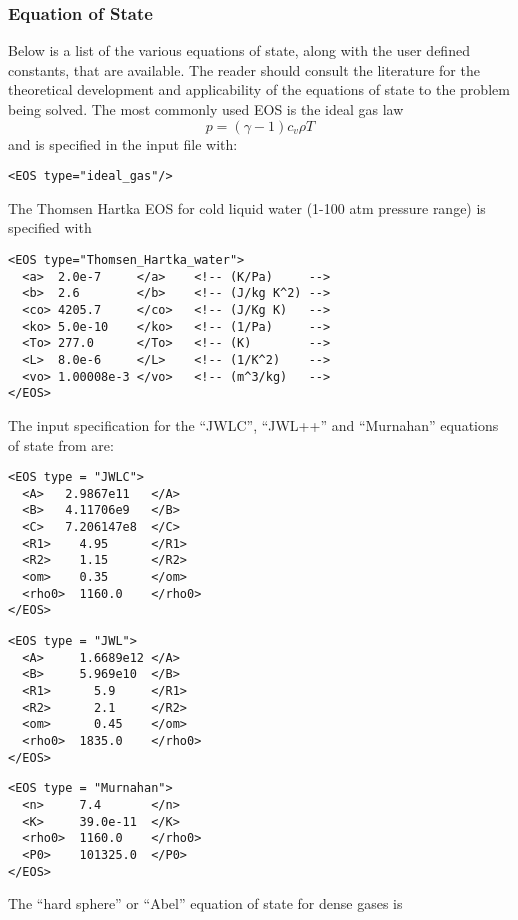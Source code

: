 \subsubsection{Equation of State}
Below is a list of the various equations of state, along with the user defined
constants, that are available.  The reader should consult the literature for
the theoretical development and applicability of the equations of state to
the problem being solved.
%
%
The most commonly used EOS is the ideal gas law
\begin{equation}
  p = (\gamma -1) c_v \rho T
\end{equation}
%
and is specified in the input file with:
%
\begin{Verbatim}[fontsize=\footnotesize]
<EOS type="ideal_gas"/>
\end{Verbatim}
%
The Thomsen Hartka EOS for cold liquid water (1-100 atm pressure range)
is specified with \cite{ref:Thomsen,ref:bejan}
%
\begin{Verbatim}[fontsize=\footnotesize]
<EOS type="Thomsen_Hartka_water">
  <a>  2.0e-7     </a>    <!-- (K/Pa)     -->    
  <b>  2.6        </b>    <!-- (J/kg K^2) -->
  <co> 4205.7     </co>   <!-- (J/Kg K)   -->
  <ko> 5.0e-10    </ko>   <!-- (1/Pa)     -->
  <To> 277.0      </To>   <!-- (K)        -->
  <L>  8.0e-6     </L>    <!-- (1/K^2)    -->
  <vo> 1.00008e-3 </vo>   <!-- (m^3/kg)   -->
</EOS>
\end{Verbatim}
% 
%
The input specification for the ``JWLC'', ``JWL++'' and ``Murnahan'' equations of state from \cite{ref:JWL} are: 
\begin{Verbatim}[fontsize=\footnotesize]
<EOS type = "JWLC">
  <A>   2.9867e11   </A>
  <B>   4.11706e9   </B>
  <C>   7.206147e8  </C>
  <R1>    4.95      </R1>
  <R2>    1.15      </R2>
  <om>    0.35      </om>
  <rho0>  1160.0    </rho0>
</EOS>
\end{Verbatim}
%
\begin{Verbatim}[fontsize=\footnotesize]
<EOS type = "JWL">
  <A>     1.6689e12 </A>
  <B>     5.969e10  </B>
  <R1>      5.9     </R1>
  <R2>      2.1     </R2>
  <om>      0.45    </om>
  <rho0>  1835.0    </rho0>
</EOS>
\end{Verbatim}
%
\begin{Verbatim}[fontsize=\footnotesize]
<EOS type = "Murnahan">
  <n>     7.4       </n>
  <K>     39.0e-11  </K>
  <rho0>  1160.0    </rho0>
  <P0>    101325.0  </P0>
</EOS>
\end{Verbatim}
%
The ``hard sphere'' or ``Abel'' equation of state for dense gases is
